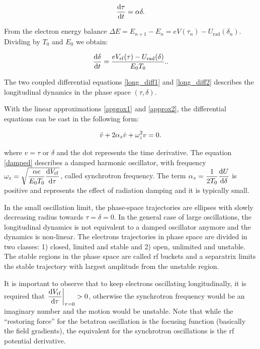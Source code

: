 \begin{equation}
\dfrac{\mathrm{d} \tau}{\mathrm{d} t} = \alpha \delta.
\label{long_diff1}
\end{equation}

From the electron energy balance $\Delta E = E_{n+1} - E_n = eV(\tau_n) - U_{\mathrm{rad}}(\delta_n)$. Dividing by $T_0$ and $E_0$ we obtain:

\begin{equation}
    \dfrac{\mathrm{d} \delta}{\mathrm{d} t} = \dfrac{eV_{\mathrm{rf}}(\tau) - U_{\mathrm{rad}}(\delta)}{E_0 T_0}.
    \label{long_diff2}.
\end{equation}

The two coupled differential equations \eqref{long_diff1} and \eqref{long_diff2} describes the longitudinal dynamics in the phase space $(\tau, \delta)$.

With the linear approximations \eqref{approx1} and \eqref{approx2}, the differential equations can be cast in the following form:

\begin{equation}
    \Ddot{v} + 2\alpha_{z} \dot{v} + \omega_{z}^2 v = 0.
    \label{damped}
\end{equation}

where $v=\tau$ or $\delta$ and the dot represents the time derivative. The equation \eqref{damped} describes a damped harmonic oscillator, with frequency $\omega_z = \sqrt{\dfrac{\alpha e}{E_0 T_0} \dfrac{\mathrm{d} V_{\mathrm{rf}}}{\mathrm{d} \tau}}$, called synchrotron frequency. The term $\alpha_z = \dfrac{1}{2T_0} \dfrac{\mathrm{d} U}{\mathrm{d} \delta}$ is positive and represents the effect of radiation damping and it is typically small. 

In the small oscillation limit, the phase-space trajectories are ellipses with slowly decreasing radius towards $\tau = \delta = 0$. In the general case of large oscillations, the longitudinal dynamics is not equivalent to a damped oscillator anymore and the dynamics is non-linear. The electrons trajectories in phase space are divided in two classes: 1) closed, limited and stable and 2) open, unlimited and unstable. The stable regions in the phase space are called \gls{rf} buckets and a separatrix limits the stable trajectory with largest amplitude from the unstable region. 

It is important to observe that to keep electrons oscillating longitudinally, it is required that $\left.\dfrac{\mathrm{d} V_{\mathrm{rf}}}{\mathrm{d} \tau}\right|_{\tau = 0} > 0$, otherwise the synchrotron frequency would be an imaginary number and the motion would be unstable. Note that while the ``restoring force'' for the betatron oscillation is the focusing function (basically the field gradients), the equivalent for the synchrotron oscillations is the \gls{rf} potential derivative.


